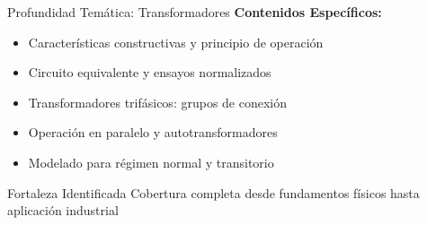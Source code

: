 \documentclass[aspectratio=43]{beamer}
\begin{document}
  \begin{frame}{Profundidad Temática: Transformadores}
  \textbf{Contenidos Específicos:}
  \begin{itemize}
  \item Características constructivas y principio de operación
  \item Circuito equivalente y ensayos normalizados
  \item Transformadores trifásicos: grupos de conexión
  \item Operación en paralelo y autotransformadores
  \item Modelado para régimen normal y transitorio
  \end{itemize}
  
  \vspace{0.3cm}
  
  \begin{exampleblock}{Fortaleza Identificada}
  Cobertura completa desde fundamentos físicos hasta aplicación industrial
  \end{exampleblock}
  
  \end{frame}
  
\end{document}

